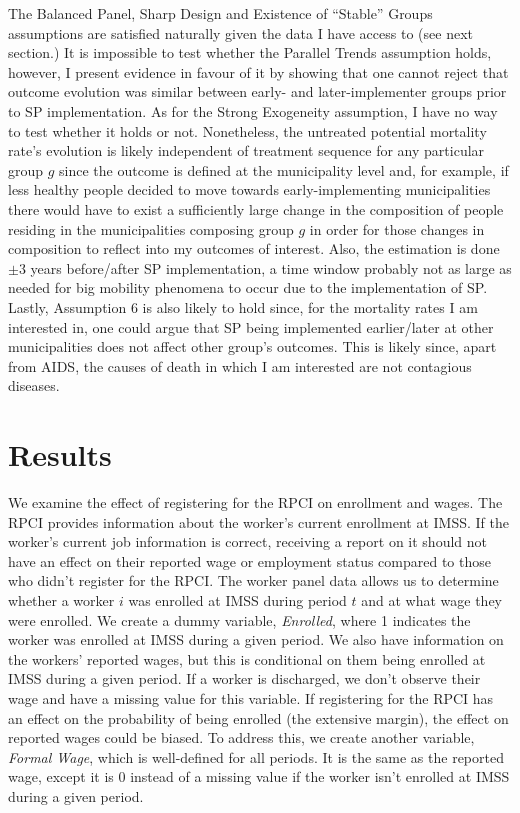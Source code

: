 \documentclass[10pt, oneside]{book}
\begin{document}
The Balanced Panel, Sharp Design and Existence of ``Stable'' Groups assumptions are satisfied naturally given the data I have access to (see next section.) It is impossible to test whether the Parallel Trends assumption holds, however, I present evidence in favour of it by showing that one cannot reject that outcome evolution was similar between early- and later-implementer groups prior to SP implementation. As for the Strong Exogeneity assumption, I have no way to test whether it holds or not. Nonetheless, the untreated potential mortality rate's evolution is likely independent of treatment sequence for any particular group $g$ since the outcome is defined at the municipality level and, for example, if less healthy people decided to move towards early-implementing municipalities there would have to exist a sufficiently large change in the composition of people residing in the municipalities composing group $g$ in order for those changes in composition to reflect into my outcomes of interest. Also, the estimation is done $\pm 3$ years before/after SP implementation, a time window probably not as large as needed for big mobility phenomena to occur due to the implementation of SP. Lastly, Assumption 6 is also likely to hold since, for the mortality rates I am interested in, one could argue that SP being implemented earlier/later at other municipalities does not affect other group's outcomes. This is likely since, apart from AIDS, the causes of death in which I am interested are not contagious diseases.

\chapter{Results} \label{results}

We examine the effect of registering for the RPCI on enrollment and wages. The RPCI provides information about the worker's current enrollment at IMSS. If the worker's current job information is correct, receiving a report on it should not have an effect on their reported wage or employment status compared to those who didn't register for the RPCI. The worker panel data allows us to determine whether a worker $i$ was enrolled at IMSS during period $t$ and at what wage they were enrolled. We create a dummy variable, \textit{Enrolled}, where 1 indicates the worker was enrolled at IMSS during a given period. We also have information on the workers' reported wages, but this is conditional on them being enrolled at IMSS during a given period. If a worker is discharged, we don't observe their wage and have a missing value for this variable. If registering for the RPCI has an effect on the probability of being enrolled (the extensive margin), the effect on reported wages could be biased. To address this, we create another variable, \textit{Formal Wage}, which is well-defined for all periods. It is the same as the reported wage, except it is 0 instead of a missing value if the worker isn't enrolled at IMSS during a given period. \\
\end{document}
